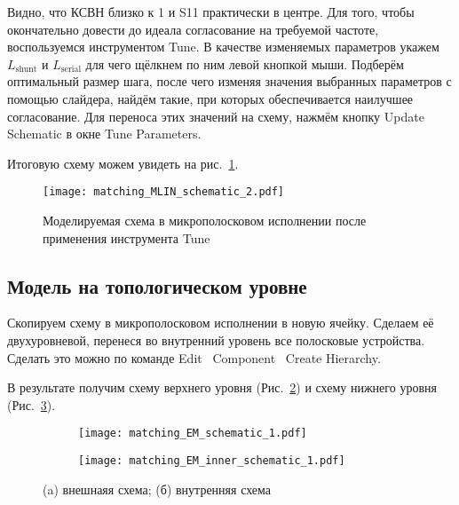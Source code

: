 Видно, что КСВН близко к 1 и S11 практически в центре.
Для того, чтобы окончательно довести до идеала согласование на требуемой частоте, воспользуемся инструментом Tune.
В качестве изменяемых параметров укажем $L_\text{shunt}$ и $L_\text{serial}$ для чего щёлкнем по ним левой кнопкой мыши.
Подберём оптимальный размер шага, после чего изменяя значения выбранных параметров с помощью слайдера, найдём такие, при которых обеспечивается наилучшее согласование.
Для переноса этих значений на схему, нажмём кнопку Update Schematic в окне Tune Parameters.

Итоговую схему можем увидеть на рис.~\ref{fig:matching_MLIN_schematic_2}.

\begin{figure}
    \centering
    \texttt{[image: matching\_MLIN\_schematic\_2.pdf]}
    \caption{Моделируемая схема в микрополосковом исполнении после применения инструмента Tune}%
    \label{fig:matching_MLIN_schematic_2}
\end{figure}

\subsection{Модель на топологическом уровне}

Скопируем схему в микрополосковом исполнении в новую ячейку. Сделаем её двухуровневой, перенеся во внутренний уровень все полосковые устройства. Сделать это можно по команде Edit \textrightarrow\ Component \textrightarrow\ Create Hierarchy.

В результате получим схему верхнего уровня (Рис.~\ref{fig:matching_EM_schematic}) и схему нижнего уровня (Рис.~\ref{fig:matching_EM_inner_schematic}).

\begin{figure}[!ht]
    \begin{subfigure}[b]{0.6\textwidth}
        \centering
        \texttt{[image: matching\_EM\_schematic\_1.pdf]}
        \caption{}%
    \label{fig:matching_EM_schematic}
    \end{subfigure}
    \hfill
    \begin{subfigure}[b]{0.3\textwidth}
        \centering
        \texttt{[image: matching\_EM\_inner\_schematic\_1.pdf]}
        \caption{}%
    \label{fig:matching_EM_inner_schematic}
    \end{subfigure}
    \caption{%
        (a) внешнаяя схема;
        (б) внутренняя схема
    }%
    \label{fig:matching_EM_schematics}
\end{figure}

